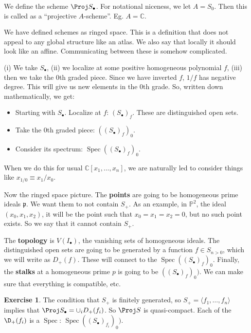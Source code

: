 \documentclass{book}
\newcommand{\C}{\ensuremath{\mathbb{C}}}
\renewcommand{\P}{\ensuremath{\mathbb{P}}}
\newcommand{\Spec}{\operatorname{Spec}}
\newcommand{\p}{\mathfrak{p}}
\theoremstyle{definition}
\newtheorem{exercise}[theorem]{Exercise}
\begin{document}
We define the scheme $\Proj S_\bullet$. For notational niceness, we let
$A = S_0$. Then this is called as a ``projective $A$-scheme''. Eg. $A = \C$.

We have defined schemes as ringed space. This is a definition that does
not appeal to any global structure like an atlas. We also say that locally
it should look like an affine. Communicating between these is somehow complicated.

(i) We take $S_\bullet$, (ii) we localize at some positive homogeneous polynomial $f$,
(iii) then we take the $0$th graded piece. Since we have inverted $f$, $1/f$ has
negative degree. This will give us new elements in the $0$th grade. So, written
down mathematically, we get:

\begin{itemize}
\item Starting with $S_\bullet$.
\iteM Localize at $f$: $(S_\bullet)_f$. These are distinguished open sets.
\item Take the $0$th graded piece: $((S_\bullet)_f)_0$.
\item Consider its spectrum: $\Spec ((S_\bullet)_f)_0$.
\end{itemize}

When we do this for usual $\C[x_1, \dots, x_n]$, we are naturally led to consider
things like $x_{1/0} \equiv x_1 / x_0$.


Now the ringed space picture. The \textbf{points}
are going to be homogeneous prime ideals
$\p$. We want them to not contain $S_+$.  As an example, in $\P^2$, the ideal
$(x_0, x_1, x_2)$, it will be the point such that $x_0 = x_1 = x_2 = 0$, but no 
such point exists. So we say that it cannot contain $S_+$.

The \textbf{topology} is $V(I_\bullet)$, the vanishing sets of homogeneous ideals.
The distinguished open sets are going to be generated by a function $f \in S_{n > 0}$,
which we will write as $D_+(f)$. These will connect to the $\Spec ((S_\bullet)_f)_0$.
Finally, the \textbf{stalks} at a homogeneous prime $p$ is going to be
$((S_\bullet)_f)_0)$. We can make sure that everything is compatible, etc.


\begin{exercise}
The condition that $S_+$ is finitely generated, so $S_+ = \langle f_1, \dots, f_n \rangle$
implies that $\Proj S_\bullet = \cup_i D_+(f_i)$. So $\Proj S$ is quasi-compact.
Each of the $\D_+(f_i)$ is a $\Spec$: $\Spec(( S_\bullet)_{f_i})_0)$.
\end{exercise}
\end{document}
